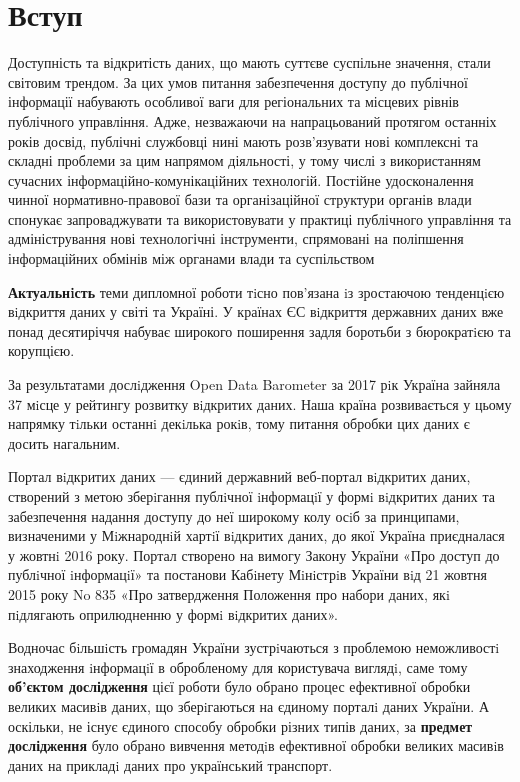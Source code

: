 \chapter*{Вступ}

Доступність та відкритість даних, що мають суттєве суспільне значення, стали світовим трендом.
За цих умов питання забезпечення доступу до публічної інформації набувають особливої ваги для регіональних та місцевих рівнів публічного управління.
Адже, незважаючи на напрацьований протягом останніх років досвід,
публічні службовці нині мають розв’язувати нові комплексні та складні проблеми за цим напрямом діяльності, у тому числі з
використанням сучасних інформаційно-комунікаційних технологій.
Постійне удосконалення чинної нормативно-правової бази та
організаційної структури органів влади спонукає запроваджувати та
використовувати у практиці публічного управління та адміністрування нові технологічні інструменти, спрямовані на поліпшення
інформаційних обмінів між органами влади та суспільством

\textbf{Актуальнiсть} теми дипломної роботи тiсно пов’язана iз зростаючою
тенденцiєю вiдкриття даних у світі та Україні.
У країнах ЄС вiдкриття державних даних вже понад десятиріччя набуває широкого
поширення задля боротьби з бюрократiєю та корупцією.

За результатами дослiдження Open Data Barometer за 2017 рiк
Україна зайняла 37 мiсце у рейтингу розвитку вiдкритих даних.
Наша країна розвивається у цьому напрямку тiльки останнi декiлька рокiв,
тому питання обробки цих даних є досить нагальним.

Портал вiдкритих даних — єдиний державний веб-портал вiдкритих даних,
створений з метою зберiгання публiчної iнформацiї у формi вiдкритих даних
та забезпечення надання доступу до неї широкому колу осiб за принципами,
визначеними у Мiжнароднiй хартiї вiдкритих даних, до якої Україна приєдналася
у жовтнi 2016 року. Портал створено на вимогу Закону України «Про доступ до
публiчної iнформацiї» та постанови Кабiнету Мiнiстрiв України вiд 21 жовтня
2015 року No 835 «Про затвердження Положення про набори даних,
якi пiдлягають оприлюдненню у формi вiдкритих даних».

Водночас бiльшiсть громадян України зустрiчаються з проблемою неможливостi
знаходження iнформацiї в обробленому для користувача виглядi, саме тому
\textbf{об'єктом дослідження} цієї роботи було обрано процес ефективної обробки
великих масивiв даних, що зберiгаються на єдиному порталi даних України.
А оскільки, не існує єдиного способу обробки різних типів даних, за
\textbf{предмет дослідження} було обрано  вивчення методiв ефективної обробки
великих масивiв даних на прикладi даних про український транспорт.

